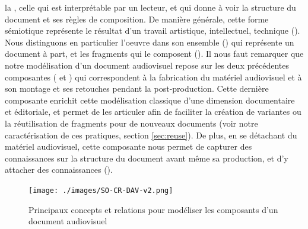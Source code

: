\begin{liste}
	\item la , celle qui est interprétable par un lecteur, et qui donne à voir la structure du document et ses règles de composition.
	De manière générale, cette forme sémiotique représente le résultat d'un travail artistique, intellectuel, technique ().
	Nous distinguons en particulier l'oeuvre dans son ensemble () qui représente un document à part, et les fragments qui le composent ().
	Il nous faut remarquer que notre modélisation d'un document audiovisuel repose sur les deux précédentes composantes ( et ) qui correspondent à la fabrication du matériel audiovisuel et à son montage et ses retouches pendant la post-production.
	Cette dernière composante enrichit cette modélisation classique d'une dimension documentaire et éditoriale, et permet de les articuler afin de faciliter la création de variantes ou la réutilisation de fragments pour de nouveaux documents (voir notre caractérisation de ces pratiques, section \ref{sec:reuse}).
	De plus, en se détachant du matériel audiovisuel, cette composante nous permet de capturer des connaissances sur la structure du document avant même sa production, et d'y attacher des connaissances ().
\end{liste}

\begin{figure}[ht!]
\centering
\texttt{[image: ./images/SO-CR-DAV-v2.png]}
\caption{Principaux concepts et relations pour modéliser les composants d'un document audiovisuel}
\label{img:so-cr-dav}
\end{figure}

